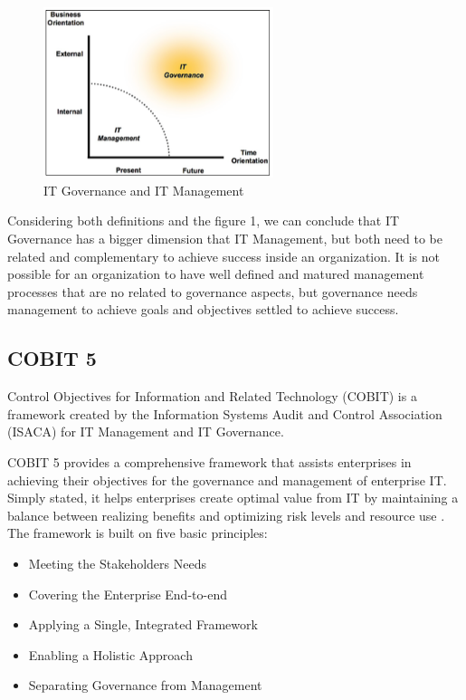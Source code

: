 \begin{figure}
\centering
\includegraphics[width=0.6\textwidth]{img/ITGovernanceAndManagement.png}
\caption{IT Governance and IT Management}
\end{figure}


 Considering both definitions and the figure 1, we can conclude that IT Governance has a bigger dimension that IT Management, but both need to be related and complementary to achieve success inside an organization. It is not possible for an organization to have well defined and matured management processes that are no related to governance aspects, but governance needs management to achieve goals and objectives settled to achieve success.

\subsection{COBIT 5}

Control Objectives for Information and Related Technology (COBIT) is a framework created by the Information Systems Audit and Control Association (ISACA) for IT Management and IT Governance.\par
COBIT 5 provides a comprehensive framework that assists enterprises in achieving their objectives for the governance and management of enterprise IT. Simply stated, it helps enterprises create optimal value from IT by maintaining a balance between realizing benefits and optimizing risk levels and resource use \cite{2012cobit}. The framework is built on five basic principles:

\begin{itemize}
  \item Meeting the Stakeholders Needs 
  \item Covering the Enterprise End-to-end
  \item Applying a Single, Integrated Framework
  \item Enabling a Holistic Approach
  \item Separating Governance from Management
\end{itemize}



